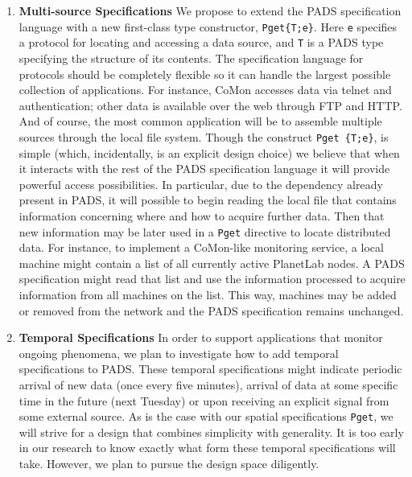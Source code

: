 \documentclass[11pt]{article}
\begin{document}
\begin{enumerate}
\item {\bf Multi-source Specifications}  
We propose to extend the PADS specification language with a new first-class
type constructor, \texttt{Pget\{T;e\}}.  Here \texttt{e} specifies
a protocol for locating and accessing a data source, and \texttt{T} is a PADS type specifying the
structure of its contents.  The specification language for protocols should be completely flexible
so it can handle the largest possible collection of applications.  For instance,
CoMon accesses data via telnet and authentication; other data is available over the web
through FTP and HTTP.  And of course, the most common application will be to assemble
multiple sources through the local file system.  Though the construct \texttt{Pget \{T;e\}},
is simple (which, incidentally, is an explicit design choice)
we believe that when it interacts with the rest of the PADS specification language
it will provide powerful access possibilities.  In particular, due to the dependency 
already present in PADS, it will possible to begin reading the local file that contains information
concerning where and how to acquire further data.  Then that new information may be later used
in a \texttt{Pget} directive to locate distributed data.  For instance, to implement
a CoMon-like monitoring service, a local machine might contain a list of all currently active
PlanetLab nodes.  A PADS specification might read that list and use the information processed to
acquire information from all machines on the list.  This way, machines may be added or removed
from the network and the PADS specification remains unchanged.


\item {\bf Temporal Specifications}
In order to support applications that monitor ongoing phenomena, we plan to investigate how to add
temporal specifications to PADS.  These temporal specifications might indicate periodic arrival of
new data (once every five minutes), arrival of data at some specific time in the future (next Tuesday)
or upon receiving an explicit signal from some external source.  As is the case with our 
spatial specifications \texttt{Pget}, we will strive for a design that combines simplicity with
generality.  It is too early in our research to know exactly what form these temporal specifications 
will take.  However, we plan to pursue the design space diligently.


\end{enumerate}
\end{document}
